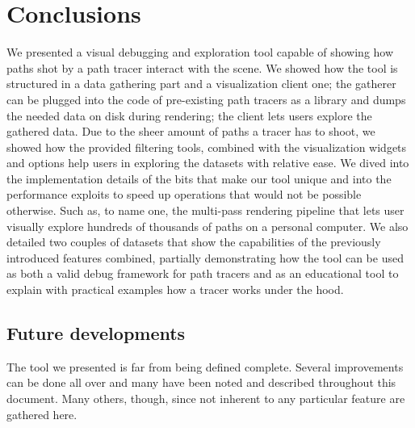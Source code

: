 \chapter{Conclusions}

We presented a visual debugging and exploration tool capable of showing how paths shot by a path tracer interact with the scene. We showed how the tool is structured in a data gathering part and a visualization client one; the gatherer can be plugged into the code of pre-existing path tracers as a library and dumps the needed data on disk during rendering; the client lets users explore the gathered data. Due to the sheer amount of paths a tracer has to shoot, we showed how the provided filtering tools, combined with the visualization widgets and options help users in exploring the datasets with relative ease. We dived into the implementation details of the bits that make our tool unique and into the performance exploits to speed up operations that would not be possible otherwise.
Such as, to name one, the multi-pass rendering pipeline that lets user visually explore hundreds of thousands of paths on a personal computer. We also detailed two couples of datasets that show the capabilities of the previously introduced features combined, partially demonstrating how the tool can be used as both a valid debug framework for path tracers and as an educational tool to explain with practical examples how a tracer works under the hood.

\section{Future developments}

The tool we presented is far from being defined complete. Several improvements can be done all over and many have been noted and described throughout this document. Many others, though, since not inherent to any particular feature are gathered here.

